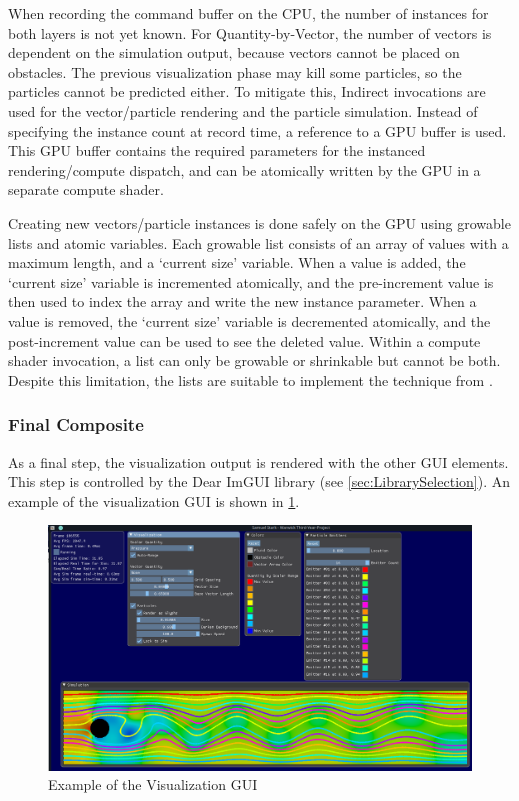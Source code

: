 When recording the command buffer on the CPU, the number of instances for both layers is not yet known.
For Quantity-by-Vector, the number of vectors is dependent on the simulation output, because vectors cannot be placed on obstacles.
The previous visualization phase may kill some particles, so the particles cannot be predicted either.
To mitigate this, Indirect invocations are used for the vector/particle rendering and the particle simulation.
Instead of specifying the instance count at record time, a reference to a GPU buffer is used.
This GPU buffer contains the required parameters for the instanced rendering/compute dispatch, and can be atomically written by the GPU in a separate compute shader.

Creating new vectors/particle instances is done safely on the GPU using growable lists and atomic variables.
Each growable list consists of an array of values with a maximum length, and a `current size' variable.
When a value is added, the `current size' variable is incremented atomically, and the pre-increment value is then used to index the array and write the new instance parameter.
When a value is removed, the `current size' variable is decremented atomically, and the post-increment value can be used to see the deleted value.
Within a compute shader invocation, a list can only be growable or shrinkable but cannot be both.
Despite this limitation, the lists are suitable to implement the technique from \cite{WickedEngineParticles}.

\subsubsection{Final Composite}
As a final step, the visualization output is rendered with the other GUI elements.
This step is controlled by the Dear ImGUI library (see \cref{sec:LibrarySelection}).
An example of the visualization GUI is shown in \cref{fig:viz_gui}.

\begin{figure}[b]
    \centering
    \includegraphics[width=\linewidth]{Ch42Design/figures/dan.png}
    \caption{Example of the Visualization GUI}
    \label{fig:viz_gui}
\end{figure}
